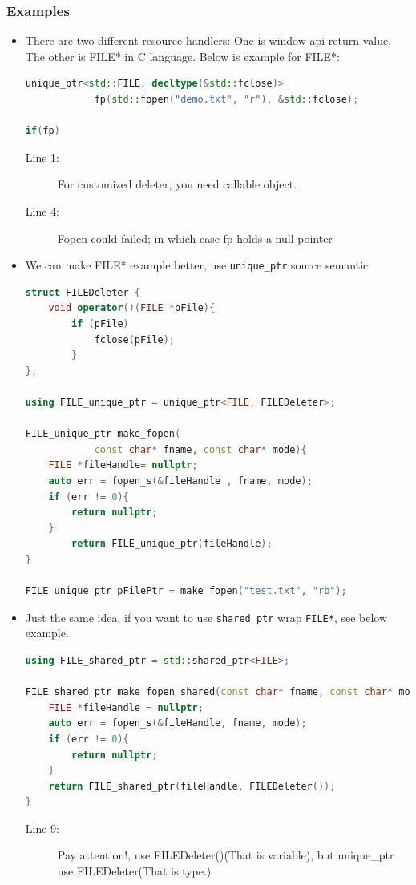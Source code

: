 \documentclass[a4paper,11pt,twoside]{book}
\begin{document}
\subsubsection{Examples}
\begin{itemize}
	\item There are two different resource handlers: One is window api return value, The other is FILE* in C language. Below is example for FILE*:
	
\begin{lstlisting}[frame=single, language=c++]
unique_ptr<std::FILE, decltype(&std::fclose)> 
			fp(std::fopen("demo.txt", "r"), &std::fclose);
			
if(fp) 
\end{lstlisting}
\begin{description}
	\item[Line 1:] For customized deleter, you need callable object.
	\item[Line 4:] Fopen could failed; in which case fp holds a null pointer
\end{description}
	
	\item We can make FILE* example better, use \texttt{unique\_ptr} source semantic.
\begin{lstlisting}[frame=single, language=c++]
struct FILEDeleter {
	void operator()(FILE *pFile){
		if (pFile)
			fclose(pFile);
		}
};
	
using FILE_unique_ptr = unique_ptr<FILE, FILEDeleter>;
	
FILE_unique_ptr make_fopen(
			const char* fname, const char* mode){
	FILE *fileHandle= nullptr;
	auto err = fopen_s(&fileHandle , fname, mode); 
	if (err != 0){
		return nullptr;
	} 
		return FILE_unique_ptr(fileHandle);
}
	
FILE_unique_ptr pFilePtr = make_fopen("test.txt", "rb");
\end{lstlisting}
	
\item Just the same idea, if you want to use \texttt{shared\_ptr} wrap \texttt{FILE*}, see below example.
\begin{lstlisting}[frame=single, language=c++]
using FILE_shared_ptr = std::shared_ptr<FILE>;
	
FILE_shared_ptr make_fopen_shared(const char* fname, const char* mode){
	FILE *fileHandle = nullptr;
	auto err = fopen_s(&fileHandle, fname, mode);
	if (err != 0){
		return nullptr;
	}
	return FILE_shared_ptr(fileHandle, FILEDeleter());
}
\end{lstlisting}
\begin{description}
	\item[Line 9:] Pay attention!, use FILEDeleter()(That is variable), but unique\_ptr use FILEDeleter(That is type.)
\end{description}


\end{itemize}
\end{document}
